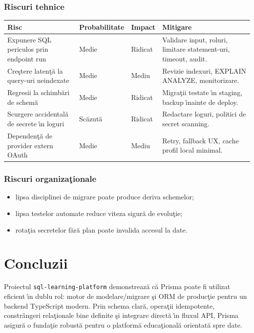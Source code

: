 \documentclass[12pt,onecolumn,draftclsnofoot]{IEEEtran}
\begin{document}
\subsubsection{Riscuri tehnice}
\begin{longtable}{p{} p{} p{} p{}}
\toprule
\textbf{Risc} & \textbf{Probabilitate} & \textbf{Impact} & \textbf{Mitigare} \\
\midrule
Expunere SQL periculos prin endpoint run & Medie & Ridicat & Validare input, roluri, limitare statement-uri, timeout, audit. \\
Cre\c{s}tere laten\c{t}\u{a} la query-uri neindexate & Medie & Mediu & Revizie indexuri, EXPLAIN ANALYZE, monitorizare. \\
Regresii la schimb\u{a}ri de schem\u{a} & Medie & Ridicat & Migra\c{t}ii testate \^{\i}n staging, backup \^{\i}nainte de deploy. \\
Scurgere accidental\u{a} de secrete \^{\i}n loguri & Sc\u{a}zut\u{a} & Ridicat & Redactare loguri, politici de secret scanning. \\
Dependen\c{t}\u{a} de provider extern OAuth & Medie & Mediu & Retry, fallback UX, cache profil local minimal. \\
\bottomrule
\end{longtable}

\subsubsection{Riscuri organiza\c{t}ionale}
\begin{itemize}
  \item lipsa disciplinei de migrare poate produce deriva schemelor;
  \item lipsa testelor automate reduce viteza sigur\u{a} de evolu\c{t}ie;
  \item rota\c{t}ia secretelor f\u{a}r\u{a} plan poate invalida accesul la date.
\end{itemize}

\section{Concluzii}
Proiectul \texttt{sql-learning-platform} demonstreaz\u{a} c\u{a} Prisma poate fi utilizat eficient \^{\i}n dublu rol: motor de modelare/migrare \c{s}i ORM de produc\c{t}ie pentru un backend TypeScript modern. Prin schema clar\u{a}, opera\c{t}ii idempotente, constr\^{a}ngeri rela\c{t}ionale bine definite \c{s}i integrare direct\u{a} \^{\i}n fluxul API, Prisma asigur\u{a} o funda\c{t}ie robust\u{a} pentru o platform\u{a} educa\c{t}ional\u{a} orientat\u{a} spre date.
\end{document}
